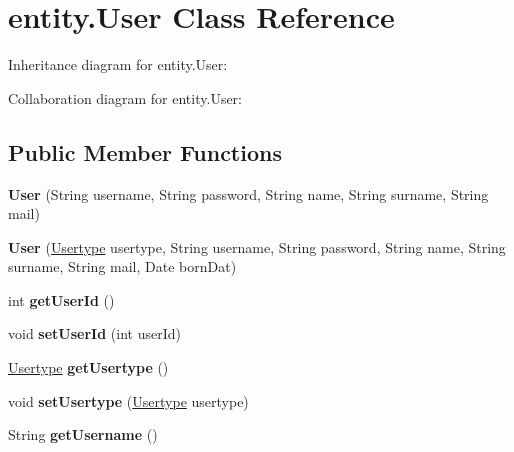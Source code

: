 \hypertarget{classentity_1_1_user}{}\section{entity.\+User Class Reference}
\label{classentity_1_1_user}


Inheritance diagram for entity.\+User\+:


Collaboration diagram for entity.\+User\+:
\subsection*{Public Member Functions}
\begin{DoxyCompactItemize}
\item 
\mbox{\label{classentity_1_1_user_a930c504e6004ddb37035544fbd904166}} 
{\bfseries User} (String username, String password, String name, String surname, String mail)
\item 
\mbox{\label{classentity_1_1_user_a030c1335a60b60d90e731b1438292d3b}} 
{\bfseries User} (\mbox{\hyperlink{classentity_1_1_usertype}{Usertype}} usertype, String username, String password, String name, String surname, String mail, Date born\+Dat)
\item 
\mbox{\label{classentity_1_1_user_a4004338c97a54b7a80369b5aad8fad0f}} 
int {\bfseries get\+User\+Id} ()
\item 
\mbox{\label{classentity_1_1_user_a58e8f4d8e357810b972d52dc1383013e}} 
void {\bfseries set\+User\+Id} (int user\+Id)
\item 
\mbox{\label{classentity_1_1_user_a050e73c7a9b10da8cec45c60afe9b942}} 
\mbox{\hyperlink{classentity_1_1_usertype}{Usertype}} {\bfseries get\+Usertype} ()
\item 
\mbox{\label{classentity_1_1_user_a0981e69a22d9baed58f63d8e757ae7a7}} 
void {\bfseries set\+Usertype} (\mbox{\hyperlink{classentity_1_1_usertype}{Usertype}} usertype)
\item 
\mbox{\label{classentity_1_1_user_a346d96c8b90b4ba0446170f2bf913be8}} 
String {\bfseries get\+Username} ()

\end{DoxyCompactItemize}
